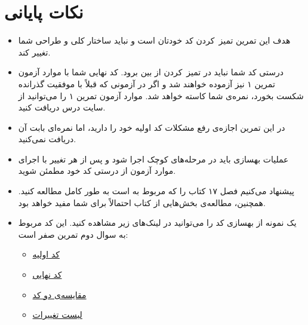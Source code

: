 \documentclass{utap}
\begin{document}
\section{نکات پایانی}
      \begin{itemize}
         \item
هدف این تمرین تمیز~کردن کد خودتان است و نباید ساختار کلی و طراحی شما تغییر کند.
        \item
درستی کد شما نباید در تمیز~کردن از بین برود.
کد نهایی شما با موارد آزمون تمرین ۱ نیز آزموده خواهند شد و اگر در آزمونی که قبلاً با موفقیت گذرانده شکست بخورد، نمره‌ی شما کاسته خواهد شد.
موارد آزمون تمرین ۱ را می‌توانید از سایت درس دریافت کنید.
        \item
در این تمرین اجازه‌ی رفع مشکلات کد اولیه خود را دارید، اما نمره‌ای بابت آن دریافت نمی‌کنید.
        \item
عملیات بهسازی باید در مرحله‌های کوچک اجرا شود و پس از هر تغییر با اجرای موارد آزمون از درستی کد خود مطمئن شوید.
        \item
پیشنهاد می‌کنیم فصل ۱۷ کتاب  را که مربوط به  است به طور کامل مطالعه کنید.
همچنین، مطالعه‌ی بخش‌هایی از کتاب  احتمالاً برای شما مفید خواهد بود.
        \item
یک نمونه از بهسازی کد را می‌توانید در لینک‌های زیر مشاهده کنید. این کد مربوط به سوال دوم تمرین صفر است:
\begin{itemize}[noitemsep]
    \item \href{https://github.com/UTAP/Spring98-Refactoring/blob/9a343d51e5ad14e59384a166928c5f808fe9ba35/main.cpp}{کد اولیه}
    \item \href{https://github.com/UTAP/Spring98-Refactoring/blob/master/main.cpp}{کد نهایی}
    \item \href{https://github.com/UTAP/Spring98-Refactoring/compare/9a343d51e5ad14e59384a166928c5f808fe9ba35..master?diff=split#diff-118fcbaaba162ba17933c7893247df3a}{مقایسه‌ی دو کد}
    \item \href{https://github.com/UTAP/Spring98-Refactoring/commits/master}{لیست تغییرات}
\end{itemize}

\end{itemize}
\end{document}
